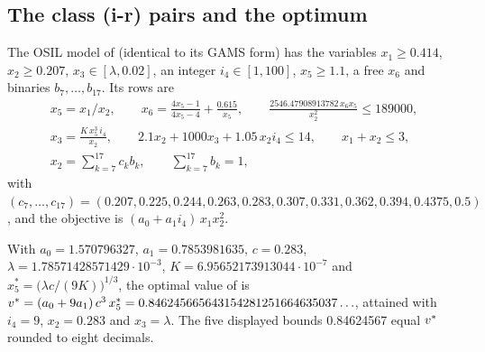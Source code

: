 \subsection{The class (i-r) pairs and the \texorpdfstring{}{spring} optimum}\label{app:audit-spring}

The OSIL model of  (identical to its GAMS form) has the variables $x_1\ge0.414$, $x_2\ge0.207$, $x_3\in[\lambda,0.02]$, an integer $i_4\in[1,100]$, $x_5\ge1.1$, a free $x_6$ and binaries $b_7,\dots,b_{17}$.
Its rows are
\begin{gather*}
  x_5=x_1/x_2,\qquad x_6=\frac{4x_5-1}{4x_5-4}+\frac{0.615}{x_5},\qquad \frac{2546.47908913782\,x_6x_5}{x_2^2}\le189000,\\
  x_3=\frac{K\,x_5^3\,i_4}{x_2},\qquad 2.1x_2+1000x_3+1.05\,x_2i_4\le14,\qquad x_1+x_2\le3,\\
  x_2=\sum_{k=7}^{17}c_kb_k,\qquad \sum_{k=7}^{17}b_k=1,
\end{gather*}
with $(c_7,\dots,c_{17})=(0.207,0.225,0.244,0.263,0.283,0.307,0.331,0.362,0.394,0.4375,0.5)$, and the objective is $(a_0+a_1i_4)\,x_1x_2^2$.

\begin{proposition}\label{prop:spring-opt}
With $a_0=1.570796327$, $a_1=0.7853981635$, $c=0.283$, $\lambda=1.78571428571429\cdot10^{-3}$, $K=6.95652173913044\cdot10^{-7}$ and $x_5^\ast=\bigl(\lambda c/(9K)\bigr)^{1/3}$, the optimal value of  is $v^{*}=(a_0+9a_1)\,c^{3}\,x_5^\ast=0.846245665643154281251664635037\ldots$, attained with $i_4=9$, $x_2=0.283$ and $x_3=\lambda$.
The five displayed bounds 0.84624567 equal $v^{*}$ rounded to eight decimals.
\end{proposition}


